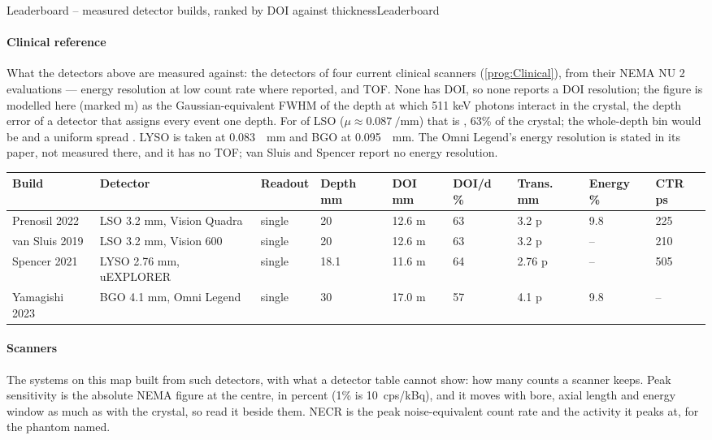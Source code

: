 \begin{programnote}{Leaderboard -- measured detector builds, ranked by DOI against thickness}{Leaderboard}
\paragraph{Clinical reference}
What the detectors above are measured against: the detectors of four current
clinical scanners (\ref{prog:Clinical}), from their NEMA NU 2 evaluations ---
energy resolution at low count rate where reported, and TOF. None has DOI, so
none reports a DOI resolution; the figure is modelled here (marked m) as the
Gaussian-equivalent FWHM of the depth at which 511 keV photons interact in the
crystal, the depth error of a detector that assigns every event one depth.
For  of LSO ($\mu \approx \qty{0.087}{\per\mm}$) that is ,
63\% of the crystal; the whole-depth bin would be  and a uniform spread
. LYSO is taken at \qty{0.083}{\per\mm} and BGO at
\qty{0.095}{\per\mm}. The Omni Legend's energy resolution is stated in its
paper, not measured there, and it has no TOF; van Sluis and Spencer report no
energy resolution.

\begin{center}
\begin{scriptsize}
\setlength{\tabcolsep}{1.5pt}
\begin{tabular}{lllllllll}
\hline
Build & Detector & Readout & Depth mm & DOI mm & DOI/d \% & Trans. mm & Energy \% & CTR ps \\
\hline
Prenosil 2022 & LSO 3.2 mm, Vision Quadra & single & 20 & 12.6 m & 63 & 3.2 p & 9.8 & 225 \\
van Sluis 2019 & LSO 3.2 mm, Vision 600 & single & 20 & 12.6 m & 63 & 3.2 p & -- & 210 \\
Spencer 2021 & LYSO 2.76 mm, uEXPLORER & single & 18.1 & 11.6 m & 64 & 2.76 p & -- & 505 \\
Yamagishi 2023 & BGO 4.1 mm, Omni Legend & single & 30 & 17.0 m & 57 & 4.1 p & 9.8 & -- \\
\hline
\end{tabular}
\end{scriptsize}
\end{center}

\paragraph{Scanners}
The systems on this map built from such detectors, with what a detector table
cannot show: how many counts a scanner keeps. Peak sensitivity is the absolute
NEMA figure at the centre, in percent (1\% is \qty{10}{cps/\kilo\becquerel}), and
it moves with bore, axial length and energy window as much as with the crystal,
so read it beside them. NECR is the peak noise-equivalent count rate and the
activity it peaks at, for the phantom named.


\end{programnote}
